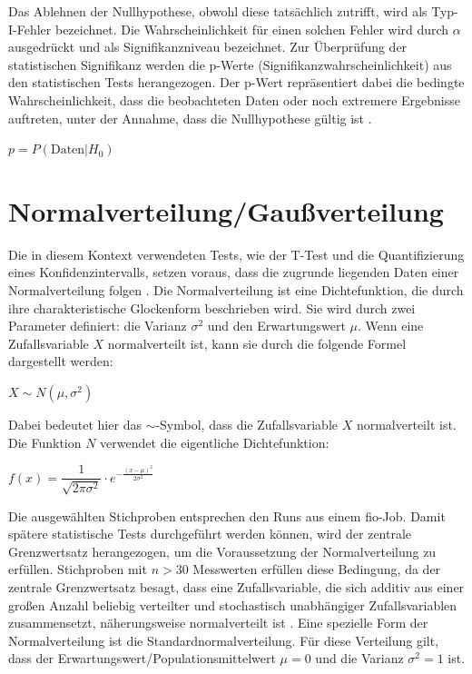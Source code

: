 Das Ablehnen der Nullhypothese, obwohl diese tatsächlich zutrifft, wird als Typ-I-Fehler bezeichnet. 
Die Wahrscheinlichkeit für einen solchen Fehler wird durch $\alpha$ ausgedrückt und als Signifikanzniveau bezeichnet.
Zur Überprüfung der statistischen Signifikanz werden die p-Werte (Signifikanzwahrscheinlichkeit) aus den statistischen Tests herangezogen. 
Der p-Wert repräsentiert dabei die bedingte Wahrscheinlichkeit, 
dass die beobachteten Daten oder noch extremere Ergebnisse auftreten, unter der Annahme, dass die Nullhypothese gültig ist \cite{inferenzstatistik}.

\begin{center}
  $p = P(\text{Daten}|H_0)$
\end{center}

\section{Normalverteilung/Gaußverteilung}

Die in diesem Kontext verwendeten Tests, wie der T-Test und die Quantifizierung eines Konfidenzintervalls, setzen voraus, 
dass die zugrunde liegenden Daten einer Normalverteilung folgen \cite{inferenzstatistik}.
Die Normalverteilung ist eine Dichtefunktion, die durch ihre charakteristische Glockenform beschrieben wird. Sie wird durch zwei Parameter definiert: 
die Varianz $\sigma^2$ und den Erwartungswert $\mu$. Wenn eine Zufallsvariable $X$ normalverteilt ist, kann sie durch die folgende Formel dargestellt werden:

\begin{center}
  $X \sim N(\mu,\sigma^2)$
\end{center}

Dabei bedeutet hier das $\sim$-Symbol, dass die Zufallsvariable $X$ normalverteilt ist.
Die Funktion $N$ verwendet die eigentliche Dichtefunktion:

\begin{center}
  $f(x) = \dfrac{1}{\sqrt{2\pi\sigma^2}} \cdot e^{-\frac{(x-\mu)^2}{2\sigma^2}}$
\end{center}

Die ausgewählten Stichproben entsprechen den Runs aus einem fio-Job. 
Damit spätere statistische Tests durchgeführt werden können, wird der zentrale Grenzwertsatz herangezogen, 
um die Voraussetzung der Normalverteilung zu erfüllen.
Stichproben mit $n>30$ Messwerten erfüllen diese Bedingung, da der zentrale Grenzwertsatz besagt, 
dass eine Zufallsvariable, die sich additiv aus einer großen Anzahl beliebig verteilter und stochastisch unabhängiger Zufallsvariablen zusammensetzt, 
näherungsweise normalverteilt ist \cite{statistically_rigorous}.
Eine spezielle Form der Normalverteilung ist die Standardnormalverteilung. Für diese Verteilung gilt, dass der Erwartungswert/Populationsmittelwert $\mu=0$ und die Varianz $\sigma^2=1$ ist.


